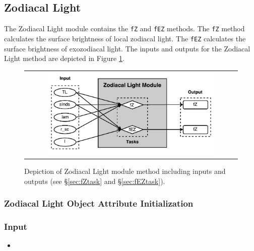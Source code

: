 \documentclass[cleanfoot]{asme2ej}
\newcommand{\reffig}[1]{Figure \ref{#1}}
\begin{document}

\subsection{Zodiacal Light}\label{sec:zodiacallight}

The Zodiacal Light module contains the \verb+fZ+ and \verb+fEZ+ methods. The \verb+fZ+ method calculates the surface brightness of local zodiacal light. The \verb+fEZ+ calculates the surface brightness of exozodiacal light. The inputs and outputs for the Zodiacal Light method are depicted in \reffig{fig:zodiacallightmodule}.

\begin{figure}[ht]
    \begin{center}
        \begin{tabular}{c}
             \includegraphics[width=0.8\textwidth]{ZodiTasks}
        \end{tabular}
    \end{center}
    \caption{\label{fig:zodiacallightmodule} Depiction of Zodiacal Light module method including inputs and outputs (see \S\ref{sec:fZtask} and \S\ref{sec:fEZtask}).}
\end{figure}

\subsubsection{Zodiacal Light Object Attribute Initialization}
\subsubsection*{Input}
\begin{itemize}
\item
{}
\end{itemize}
\end{document}
